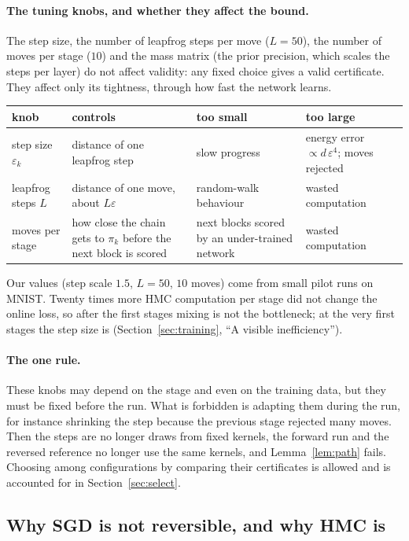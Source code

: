 \documentclass[11pt]{article}
\theoremstyle{definition}
\theoremstyle{remark}
\begin{document}
\paragraph{The tuning knobs, and whether they affect the bound.} The step size, the number of leapfrog steps per move ($L=50$),
the number of moves per stage ($10$) and the mass matrix (the prior precision, which scales the steps per layer) do not
affect validity: any fixed choice gives a valid certificate. They affect only its tightness, through how fast the network
learns.
\begin{center}\small
\renewcommand{\arraystretch}{1.2}
\begin{tabular}{@{}p{3.3cm}p{4.2cm}p{3.4cm}p{3.6cm}@{}}
\toprule
knob & controls & too small & too large\\
\midrule
step size $\varepsilon_k$ & distance of one leapfrog step & slow progress & energy error $\propto d\,\varepsilon^4$; moves rejected\\
leapfrog steps $L$ & distance of one move, about $L\varepsilon$ & random-walk behaviour & wasted computation\\
moves per stage & how close the chain gets to $\pi_k$ before the next block is scored & next blocks scored by an under-trained network & wasted computation\\
\bottomrule
\end{tabular}
\end{center}
Our values (step scale $1.5$, $L=50$, $10$ moves) come from small pilot runs on MNIST. Twenty times more HMC computation
per stage did not change the online loss, so after the first stages mixing is not the bottleneck; at the very first
stages the step size is (Section~\ref{sec:training}, ``A visible inefficiency'').

\paragraph{The one rule.} These knobs may depend on the stage and even on the training data, but they must be fixed before
the run. What is forbidden is adapting them during the run, for instance shrinking the step because the previous stage
rejected many moves. Then the steps are no longer draws from fixed kernels, the forward run and the reversed reference no
longer use the same kernels, and Lemma~\ref{lem:path} fails. Choosing among configurations by comparing their certificates
is allowed and is accounted for in Section~\ref{sec:select}.

\subsection{Why SGD is not reversible, and why HMC is}\label{sec:sgdhmc}
\end{document}

